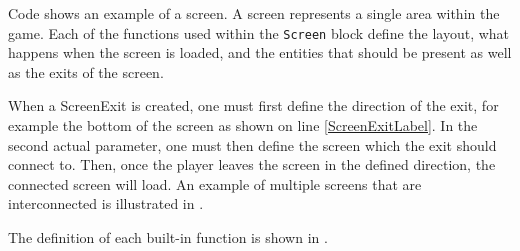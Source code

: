 Code  shows an example of a screen. A screen represents a single area within the game. Each of the functions used within the \texttt{Screen} block define the layout, what happens when the screen is loaded, and the entities that should be present as well as the exits of the screen.

When a ScreenExit is created, one must first define the direction of the exit, for example the bottom of the screen as shown on line \ref{ScreenExitLabel}.
In the second actual parameter, one must then define the screen which the exit should connect to.
Then, once the player leaves the screen in the defined direction, the connected screen will load. An example of multiple screens that are interconnected is illustrated in .


The definition of each built-in function is shown in .









